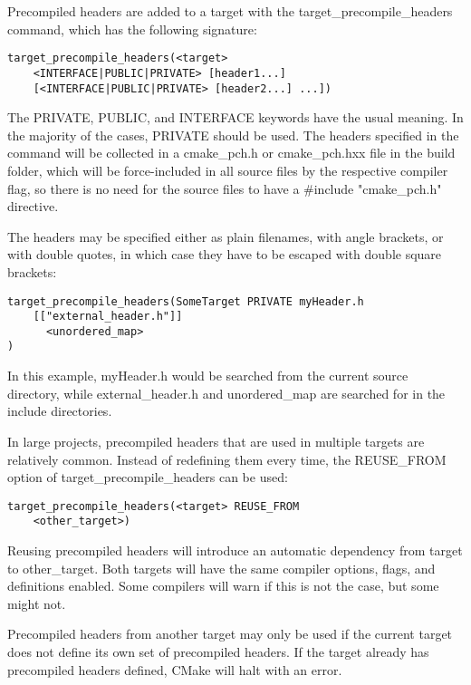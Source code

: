 Precompiled headers are added to a target with the target\_precompile\_headers command, which has the following signature:

\begin{lstlisting}[style=styleCMake]
target_precompile_headers(<target>
	<INTERFACE|PUBLIC|PRIVATE> [header1...]
	[<INTERFACE|PUBLIC|PRIVATE> [header2...] ...])
\end{lstlisting}

The PRIVATE, PUBLIC, and INTERFACE keywords have the usual meaning. In the majority of the cases, PRIVATE should be used. The headers specified in the command will be collected in a cmake\_pch.h or cmake\_pch.hxx file in the build folder, which will be force-included in all source files by the respective compiler flag, so there is no need for the source files to have a \#include "cmake\_pch.h" directive.

The headers may be specified either as plain filenames, with angle brackets, or with double quotes, in which case they have to be escaped with double square brackets:

\begin{lstlisting}[style=styleCMake]
target_precompile_headers(SomeTarget PRIVATE myHeader.h
	[["external_header.h"]]
	  <unordered_map>
)
\end{lstlisting}

In this example, myHeader.h would be searched from the current source directory, while external\_header.h and unordered\_map are searched for in the include directories.

In large projects, precompiled headers that are used in multiple targets are relatively common. Instead of redefining them every time, the REUSE\_FROM option of target\_precompile\_headers can be used:

\begin{lstlisting}[style=styleCMake]
target_precompile_headers(<target> REUSE_FROM
	<other_target>)
\end{lstlisting}

Reusing precompiled headers will introduce an automatic dependency from target to other\_target. Both targets will have the same compiler options, flags, and definitions enabled. Some compilers will warn if this is not the case, but some might not.

Precompiled headers from another target may only be used if the current target does not define its own set of precompiled headers. If the target already has precompiled headers defined, CMake will halt with an error.

